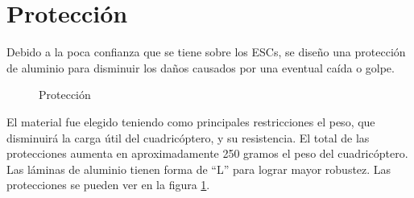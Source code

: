 \documentclass[main]{subfiles}
\begin{document}
\section{Protección}

Debido a la poca confianza que se tiene sobre los ESCs, se diseño una protección de aluminio para disminuir los daños causados por una eventual caída o golpe. \\

\begin{figure} [h!]
\centering
\vspace{-40pt}
  \caption{Protección}
  \label{fig:proteccion}
\end{figure}

El material fue elegido teniendo como principales restricciones el peso, que disminuirá la carga útil del cuadricóptero, y su resistencia. El total de las protecciones aumenta en aproximadamente 250 gramos el peso del cuadricóptero. Las láminas de aluminio tienen forma de ``L'' para lograr mayor robustez. Las protecciones se pueden ver en la figura \ref{fig:proteccion}.
\end{document}
